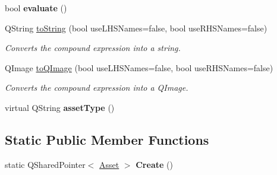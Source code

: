 \begin{DoxyCompactItemize}
\item 
\hypertarget{class_picto_1_1_compound_expression_a540916ef58b49ef9fa39a687d9397810}{bool {\bfseries evaluate} ()}\label{class_picto_1_1_compound_expression_a540916ef58b49ef9fa39a687d9397810}

\item 
Q\-String \hyperlink{class_picto_1_1_compound_expression_a18112ac309b96a520b5f2aedf80f3040}{to\-String} (bool use\-L\-H\-S\-Names=false, bool use\-R\-H\-S\-Names=false)
\begin{DoxyCompactList}\small\item\em Converts the compound expression into a string. \end{DoxyCompactList}\item 
Q\-Image \hyperlink{class_picto_1_1_compound_expression_a9f0fa06128e31c9d3301b4a746fbc417}{to\-Q\-Image} (bool use\-L\-H\-S\-Names=false, bool use\-R\-H\-S\-Names=false)
\begin{DoxyCompactList}\small\item\em Converts the compound expression into a Q\-Image. \end{DoxyCompactList}\item 
\hypertarget{class_picto_1_1_compound_expression_ab8f2b03c3ac5214207f10642d3c487b5}{virtual Q\-String {\bfseries asset\-Type} ()}\label{class_picto_1_1_compound_expression_ab8f2b03c3ac5214207f10642d3c487b5}

\end{DoxyCompactItemize}
\subsection*{Static Public Member Functions}
\begin{DoxyCompactItemize}
\item 
\hypertarget{class_picto_1_1_compound_expression_a3eb5bb6718de47e2215d72b10044be03}{static Q\-Shared\-Pointer$<$ \hyperlink{class_picto_1_1_asset}{Asset} $>$ {\bfseries Create} ()}\label{class_picto_1_1_compound_expression_a3eb5bb6718de47e2215d72b10044be03}

\end{DoxyCompactItemize}
